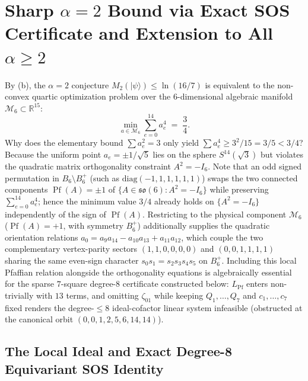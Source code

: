 \documentclass[11pt,a4paper]{article}
\theoremstyle{plain}
\theoremstyle{definition}
\theoremstyle{remark}
\newcommand{\R}{\mathbb{R}}
\newcommand{\ket}[1]{\lvert #1 \rangle}
\newcommand{\Pf}{\operatorname{Pf}}
\newcommand{\Mman}{\mathcal{M}_6}
\newcommand{\Bplus}{B_6^+}
\begin{document}
\section{Sharp \texorpdfstring{$\alpha = 2$}{alpha = 2} Bound via Exact SOS Certificate and Extension to All \texorpdfstring{$\alpha \ge 2$}{alpha >= 2}}
\label{sec:sos-bound}

By (b), the $\alpha = 2$ conjecture $M_2(\ket{\psi}) \le \ln(16/7)$ is equivalent to the non-convex quartic optimization problem over the $6$-dimensional algebraic manifold $\Mman \subset \R^{15}$:
\begin{equation}
  \label{eq:quartic-opt}
  \min_{a \in \Mman} \sum_{e=0}^{14} a_e^4 \;=\; \frac{3}{4}.
\end{equation}
Why does the elementary bound $\sum a_e^2 = 3$ only yield $\sum a_e^4 \ge 3^2/15 = 3/5 < 3/4$? Because the uniform point $a_e = \pm 1/\sqrt{5}$ lies on the sphere $S^{14}(\sqrt{3})$ but violates the quadratic matrix orthogonality constraint $A^2 = -I_6$. Note that an odd signed permutation in $B_6 \setminus \Bplus$ (such as $\mathrm{diag}(-1,1,1,1,1,1)$) swaps the two connected components $\Pf(A) = \pm 1$ of $\{A \in \mathfrak{so}(6) : A^2 = -I_6\}$ while preserving $\sum_{e=0}^{14} a_e^4$; hence the minimum value $3/4$ already holds on $\{A^2 = -I_6\}$ independently of the sign of $\Pf(A)$. Restricting to the physical component $\Mman$ ($\Pf(A) = +1$, with symmetry $\Bplus$) additionally supplies the quadratic orientation relations $a_0 = a_9 a_{14} - a_{10} a_{13} + a_{11} a_{12}$, which couple the two complementary vertex-parity sectors $(1,1,0,0,0,0)$ and $(0,0,1,1,1,1)$ sharing the same even-sign character $s_0 s_1 = s_2 s_3 s_4 s_5$ on $\Bplus$. Including this local Pfaffian relation alongside the orthogonality equations is algebraically essential for the sparse $7$-square degree-$8$ certificate constructed below: $L_{\mathrm{Pf}}$ enters non-trivially with $13$ terms, and omitting $\zeta_{01}$ while keeping $Q_1,\dots,Q_7$ and $c_1,\dots,c_7$ fixed renders the degree-$\le 8$ ideal-cofactor linear system infeasible (obstructed at the canonical orbit $(0,0,1,2,5,6,14,14)$).

\subsection{The Local Ideal and Exact Degree-8 Equivariant SOS Identity}
\end{document}
